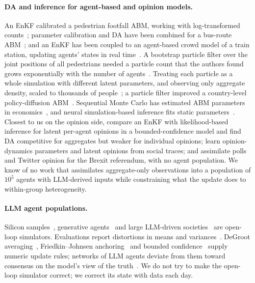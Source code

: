 \documentclass[10pt]{article}
\theoremstyle{remark}
\begin{document}
\paragraph{DA and inference for agent-based and opinion models.} An EnKF calibrated a pedestrian footfall ABM, working with log-transformed counts~\cite{ward2016}; parameter calibration and DA have been combined for a bus-route ABM~\cite{kieu2020}; and an EnKF has been coupled to an agent-based crowd model of a train station, updating agents' states in real time~\cite{suchak2024}. A bootstrap particle filter over the joint positions of all pedestrians needed a particle count that the authors found grows exponentially with the number of agents~\cite{malleson2020}. Treating each particle as a whole simulation with different latent parameters, and observing only aggregate density, scaled to thousands of people~\cite{makinoshima2022}; a particle filter improved a country-level policy-diffusion ABM~\cite{oswald2024}. Sequential Monte Carlo has estimated ABM parameters in economics~\cite{lux2018}, and neural simulation-based inference fits static parameters~\cite{cranmer2020,dignum2025}. Closest to us on the opinion side, \citet{kolic2025} compare an EnKF with likelihood-based inference for latent per-agent opinions in a bounded-confidence model and find DA competitive for aggregates but weaker for individual opinions; \citet{monti2020} learn opinion-dynamics parameters and latent opinions from social traces; and \citet{hendrickx2021} assimilate polls and Twitter opinion for the Brexit referendum, with no agent population. We know of no work that assimilates aggregate-only observations into a population of $10^5$ agents with LLM-derived inputs while constraining what the update does to within-group heterogeneity.

\paragraph{LLM agent populations.} Silicon samples~\cite{argyle2023}, generative agents~\cite{park2023,park2024} and large LLM-driven societies~\cite{piao2025,yang2024oasis,chopra2024} are open-loop simulators. Evaluations report distortions in means and variances~\cite{santurkar2023,durmus2023,bisbee2024,wang2024flatten,meister2024,ozkan2026}. DeGroot averaging~\cite{degroot1974}, Friedkin--Johnsen anchoring~\cite{friedkin1990} and bounded confidence~\cite{hegselmann2002} supply numeric update rules; networks of LLM agents deviate from them toward consensus on the model's view of the truth~\cite{chuang2023}. We do not try to make the open-loop simulator correct; we correct its state with data each day.
\end{document}
